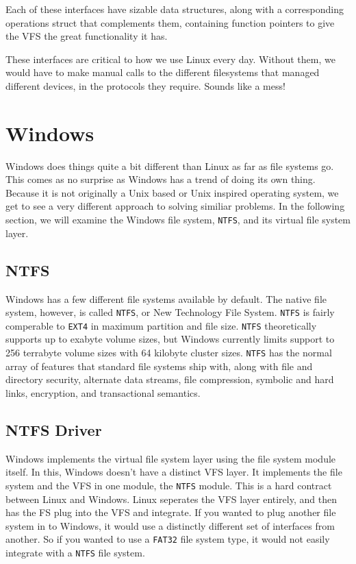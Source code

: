 \documentclass[10pt,letterpaper,onecolumn,draftclsnofoot]{IEEEtran}
\begin{document}
  Each of these interfaces have sizable data structures, along with a corresponding
  operations struct that complements them, containing function pointers to give the
  VFS the great functionality it has.\cite{robertlove2010}

  These interfaces are critical to how we use Linux every day. Without them, we
  would have to make manual calls to the different filesystems that managed different
  devices, in the protocols they require. Sounds like a mess!

\section{Windows}
Windows does things quite a bit different than Linux as far as file systems go.
This comes as no surprise as Windows has a trend of doing its own thing. Because
it is not originally a Unix based or Unix inspired operating system, we get to
see a very different approach to solving similiar problems. In the following
section, we will examine the Windows file system, \texttt{NTFS}, and its virtual
file system layer.
  \subsection{NTFS}
  Windows has a few different file systems available by default. The native file
  system, however, is called \texttt{NTFS}, or New Technology File System. 
  \texttt{NTFS} is fairly comperable to \texttt{EXT4} in maximum partition and 
  file size. \texttt{NTFS} theoretically supports up to exabyte volume sizes, but
  Windows currently limits support to 256 terrabyte volume sizes with 64 kilobyte
  cluster sizes. \texttt{NTFS} has the normal array of features that standard file
  systems ship with, along with file and directory security, alternate data streams,
  file compression, symbolic and hard links, encryption, and transactional semantics.
  \cite{internals2}
  \subsection{NTFS Driver}
  Windows implements the virtual file system layer using the file system module itself.
  In this, Windows doesn't have a distinct VFS layer. It implements the file system
  and the VFS in one module, the \texttt{NTFS} module. This is a hard contract between
  Linux and Windows. Linux seperates the VFS layer entirely, and then has the FS plug
  into the VFS and integrate. If you wanted to plug another file system in to Windows,
  it would use a distinctly different set of interfaces from another. So if you wanted
  to use a \texttt{FAT32} file system type, it would not easily integrate with a 
  \texttt{NTFS} file system. \cite{internals2}
\end{document}
